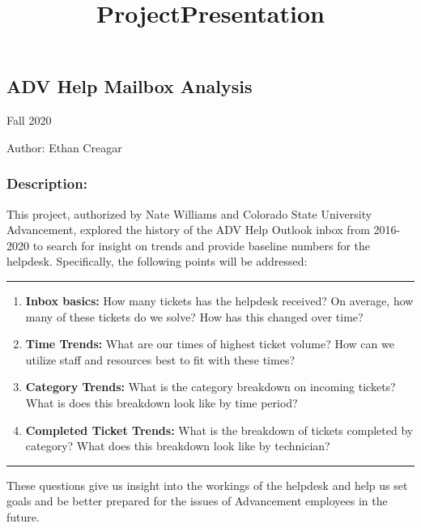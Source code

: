 \documentclass[11pt]{article}
\title{ProjectPresentation}
\begin{document}
    
\begin{center}    
    \LARGE
    \hypertarget{adv-help-mailbox-analysis}{%
\section*{ADV Help Mailbox Analysis}\label{adv-help-mailbox-analysis}}

\normalsize
Fall 2020

Author: Ethan Creagar

\end{center}

\tableofcontents
    \hypertarget{description}{%
\subsubsection{Description:}\label{description}}

This project, authorized by Nate Williams and Colorado
State University Advancement, explored the history of the ADV Help
Outlook inbox from 2016-2020 to search for insight on trends and provide
baseline numbers for the helpdesk. Specifically, the following points
will be addressed:

\begin{center}\rule{0.5\linewidth}{\linethickness}\end{center}

\begin{enumerate}
\def\labelenumi{\arabic{enumi})}
\item
  \textbf{Inbox basics:} How many tickets has the helpdesk received? On
  average, how many of these tickets do we solve? How has this changed
  over time?
\item
  \textbf{Time Trends:} What are our times of highest ticket volume? How can we utilize staff and resources best to fit with these times?
\item
  \textbf{Category Trends:} What is the category breakdown on incoming
  tickets? What is does this breakdown look like by time period?
\item
  \textbf{Completed Ticket Trends:} What is the breakdown of tickets
  completed by category? What does this breakdown look like by
  technician?
\end{enumerate}

\begin{center}\rule{0.5\linewidth}{\linethickness}\end{center}

These questions give us insight into the workings of the helpdesk and
help us set goals and be better prepared for the issues of Advancement
employees in the future.
\end{document}
